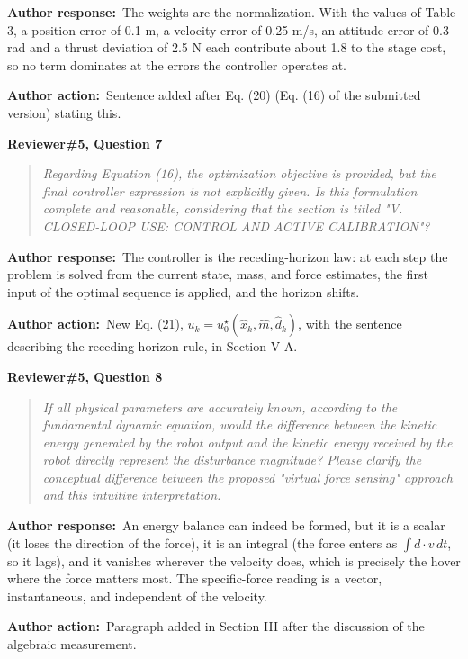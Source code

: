 \documentclass[11pt]{article}
\newcommand{\concern}[1]{\par\medskip\noindent\colorbox{gray!12}{\parbox{\dimexpr\linewidth-2\fboxsep}{\textbf{#1}}}\par\smallskip}
\newcommand{\rlabel}[1]{\par\textbf{#1}\ }
\begin{document}
\rlabel{Author response:}The weights are the normalization. With the values of Table 3, a position error of 0.1 m, a velocity error of 0.25 m/s, an attitude error of 0.3 rad and a thrust deviation of 2.5 N each contribute about 1.8 to the stage cost, so no term dominates at the errors the controller operates at.

\rlabel{Author action:}Sentence added after Eq. (20) (Eq. (16) of the submitted version) stating this.

\concern{Reviewer\#5, Question 7}

\begin{quote}\itshape Regarding Equation (16), the optimization objective is provided, but the final controller expression is not explicitly given. Is this formulation complete and reasonable, considering that the section is titled "V. CLOSED-LOOP USE: CONTROL AND ACTIVE CALIBRATION"?\end{quote}

\rlabel{Author response:}The controller is the receding-horizon law: at each step the problem is solved from the current state, mass, and force estimates, the first input of the optimal sequence is applied, and the horizon shifts.

\rlabel{Author action:}New Eq. (21), $u_k = u_0^{\star}(\hat x_k, \hat m, \hat d_k)$, with the sentence describing the receding-horizon rule, in Section V-A.

\concern{Reviewer\#5, Question 8}

\begin{quote}\itshape If all physical parameters are accurately known, according to the fundamental dynamic equation, would the difference between the kinetic energy generated by the robot output and the kinetic energy received by the robot directly represent the disturbance magnitude? Please clarify the conceptual difference between the proposed "virtual force sensing" approach and this intuitive interpretation.\end{quote}

\rlabel{Author response:}An energy balance can indeed be formed, but it is a scalar (it loses the direction of the force), it is an integral (the force enters as $\int d \cdot v\,dt$, so it lags), and it vanishes wherever the velocity does, which is precisely the hover where the force matters most. The specific-force reading is a vector, instantaneous, and independent of the velocity.

\rlabel{Author action:}Paragraph added in Section III after the discussion of the algebraic measurement.
\end{document}
